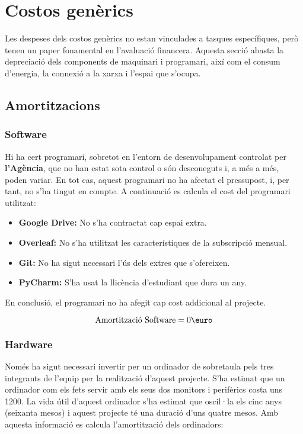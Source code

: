 \section{Costos genèrics}
Les despeses dels costos genèrics no estan vinculades a tasques específiques, però tenen un paper fonamental en l'avaluació financera. Aquesta secció abasta la depreciació dels components de maquinari i programari, així com el consum d'energia, la connexió a la xarxa i l'espai que s'ocupa. 

\subsection{Amortitzacions}
\subsubsection{Software}
Hi ha cert programari, sobretot en l'entorn de desenvolupament controlat per \textbf{l'Agència}, que no han estat sota control o són desconeguts i, a més a més, poden variar. En tot cas, aquest programari no ha afectat el pressupost, i, per tant, no s'ha tingut en compte. A continuació es calcula el cost del programari utilitzat:

\begin{itemize}
    \item \textbf{Google Drive:} No s'ha contractat cap espai extra.
    \item \textbf{Overleaf:} No s'ha utilitzat les característiques de la subscripció mensual.
    \item \textbf{Git:} No ha sigut necessari l'ús dels extres que s'ofereixen.
    \item \textbf{PyCharm:} S'ha usat la llicència d'estudiant que dura un any.
\end{itemize}

En conclusió, el programari no ha afegit cap cost addicional al projecte.

$$
\text{Amortització Software} = 0\text{\euro}
$$

\subsubsection{Hardware}
Només ha sigut necessari invertir per un ordinador de sobretaula pels tres integrants de l'equip per la realització d'aquest projecte. S'ha estimat que un ordinador com els fets servir amb els seus dos monitors i perifèrics costa uns 1200\text{\euro}. La vida útil d'aquest ordinador s'ha estimat que oscil·la els cinc anys (seixanta mesos) i aquest projecte té una duració d'uns quatre mesos. Amb aquesta informació es calcula l'amortització dels ordinadors:

